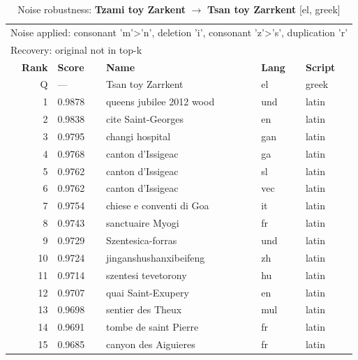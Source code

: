 \begin{table}[htbp]
\centering
\small
\caption{Noise robustness: \textbf{Tzami toy Zarkent} $\rightarrow$ \textbf{Tsan toy Zarrkent} [el, greek]}
\label{tab:noise-21}
\begin{tabular}{rllll}
\toprule
\multicolumn{5}{l}{\small Noise applied: consonant 'm'>'n', deletion 'i', consonant 'z'>'s', duplication 'r'} \\
\multicolumn{5}{l}{\small Recovery: original not in top-k} \\
\midrule
\textbf{Rank} & \textbf{Score} & \textbf{Name} & \textbf{Lang} & \textbf{Script} \\
\midrule
\rowcolor{gray!20} Q & --- & Tsan toy Zarrkent & el & greek \\
\midrule
1 & 0.9878 & queens jubilee 2012 wood & und & latin \\
2 & 0.9838 & cite Saint-Georges & en & latin \\
3 & 0.9795 & changi hospital & gan & latin \\
4 & 0.9768 & canton d'Issigeac & ga & latin \\
5 & 0.9762 & canton d'Issigeac & sl & latin \\
6 & 0.9762 & canton d'Issigeac & vec & latin \\
7 & 0.9754 & chiese e conventi di Goa & it & latin \\
8 & 0.9743 & sanctuaire Myogi & fr & latin \\
9 & 0.9729 & Szentesica-forras & und & latin \\
10 & 0.9724 & jinganshushanxibeifeng & zh & latin \\
11 & 0.9714 & szentesi tevetorony & hu & latin \\
12 & 0.9707 & quai Saint-Exupery & en & latin \\
13 & 0.9698 & sentier des Theux & mul & latin \\
14 & 0.9691 & tombe de saint Pierre & fr & latin \\
15 & 0.9685 & canyon des Aiguieres & fr & latin \\
\bottomrule
\end{tabular}
\end{table}

